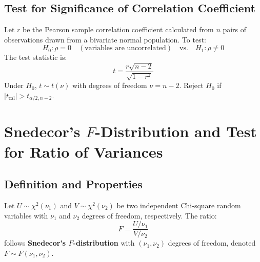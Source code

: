 \documentclass[12pt,a4paper]{article}
\begin{document}
\subsection{Test for Significance of Correlation Coefficient}

\begin{tcolorbox}[formulabox, title={\textbf{Test 4: Significance of Correlation Coefficient}}]
Let $r$ be the Pearson sample correlation coefficient calculated from $n$ pairs of observations drawn from a bivariate normal population. To test:
\begin{equation}
  H_0: \rho = 0 \quad (\text{variables are uncorrelated}) \quad \text{vs.} \quad H_1: \rho \ne 0
\end{equation}
The test statistic is:
\begin{equation}
  t = \frac{r \sqrt{n - 2}}{\sqrt{1 - r^2}}
\end{equation}
Under $H_0$, $t \sim t(\nu)$ with degrees of freedom $\nu = n - 2$. Reject $H_0$ if $|t_{\text{cal}}| > t_{\alpha/2, n-2}$.
\end{tcolorbox}

\section{Snedecor's \texorpdfstring{$F$}{F}-Distribution and Test for Ratio of Variances}

\subsection{Definition and Properties}

\begin{tcolorbox}[defbox, title={\textbf{Definition of Snedecor's $F$-Distribution}}]
Let $U \sim \chi^2(\nu_1)$ and $V \sim \chi^2(\nu_2)$ be two independent Chi-square random variables with $\nu_1$ and $\nu_2$ degrees of freedom, respectively. The ratio:
\begin{equation}
  F = \frac{U / \nu_1}{V / \nu_2}
\end{equation}
follows \textbf{Snedecor's $F$-distribution} with $(\nu_1, \nu_2)$ degrees of freedom, denoted $F \sim F(\nu_1, \nu_2)$.
\end{tcolorbox}
\end{document}
